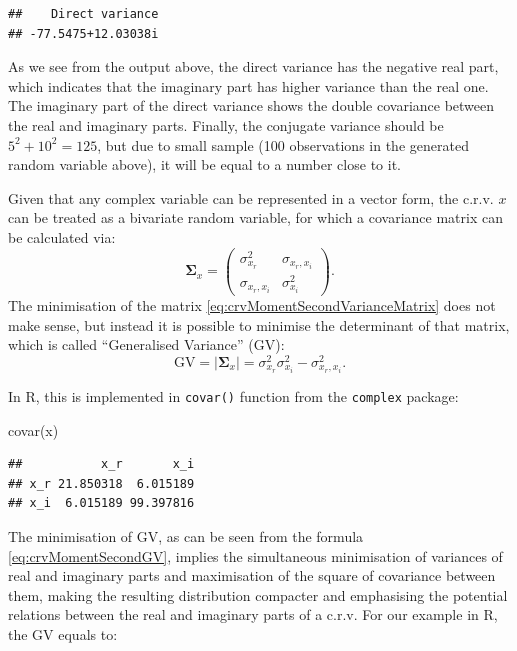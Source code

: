 \documentclass[
]{book}
\newenvironment{Shaded}{\begin{snugshade}}{\end{snugshade}}
\newcommand{\FunctionTok}[1]{\textcolor[rgb]{0.00,0.00,0.00}{#1}}
\newcommand{\NormalTok}[1]{#1}
\begin{document}
\begin{verbatim}
##    Direct variance 
## -77.5475+12.03038i
\end{verbatim}

As we see from the output above, the direct variance has the negative real part, which indicates that the imaginary part has higher variance than the real one. The imaginary part of the direct variance shows the double covariance between the real and imaginary parts. Finally, the conjugate variance should be \(5^2 + 10^2 = 125\), but due to small sample (100 observations in the generated random variable above), it will be equal to a number close to it.

Given that any complex variable can be represented in a vector form, the c.r.v. \(x\) can be treated as a bivariate random variable, for which a covariance matrix can be calculated via:
\begin{equation}
    \boldsymbol{\Sigma}_x = \begin{pmatrix} \sigma_{x_r}^2 & \sigma_{x_r, x_i} \\ \sigma_{x_r, x_i} & \sigma_{x_i}^2 \end{pmatrix} .
    \label{eq:crvMomentSecondVarianceMatrix}
\end{equation}
The minimisation of the matrix \eqref{eq:crvMomentSecondVarianceMatrix} does not make sense, but instead it is possible to minimise the determinant of that matrix, which is called ``Generalised Variance'' (GV):
\begin{equation}
    \mathrm{GV} = |\boldsymbol{\Sigma}_x| = \sigma_{x_r}^2 \sigma_{x_i}^2 - \sigma_{x_r, x_i}^2 .
    \label{eq:crvMomentSecondGV}
\end{equation}

In R, this is implemented in \texttt{covar()} function from the \texttt{complex} package:

\begin{Shaded}
\begin{Highlighting}[]
\FunctionTok{covar}\NormalTok{(x)}
\end{Highlighting}
\end{Shaded}

\begin{verbatim}
##           x_r       x_i
## x_r 21.850318  6.015189
## x_i  6.015189 99.397816
\end{verbatim}

The minimisation of GV, as can be seen from the formula \eqref{eq:crvMomentSecondGV}, implies the simultaneous minimisation of variances of real and imaginary parts and maximisation of the square of covariance between them, making the resulting distribution compacter and emphasising the potential relations between the real and imaginary parts of a c.r.v. For our example in R, the GV equals to:
\end{document}

